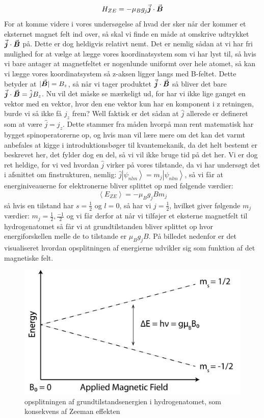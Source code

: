 \documentclass[../../Atom-ogMolekylefysik.tex]{subfiles}
\begin{document}
\begin{equation}
    H_{ZE}=-\mu_Bg_j{\vec{\boldsymbol{j}}}\cdot{\vec{\boldsymbol{B}}}
\end{equation}
For at komme videre i vores undersøgelse af hvad der sker når der kommer et eksternet magnet felt ind over, så skal vi finde en måde at omskrive udtrykket ${\vec{\boldsymbol{j}}}\cdot{\vec{\boldsymbol{B}}}$ på. Dette er dog heldigvis relativt nemt. Det er nemlig sådan at vi har fri mulighed for at vælge at lægge vores koordinatsystem som vi har lyst til, så hvis vi bare antager at magnetfeltet er nogenlunde uniformt over hele atomet, så kan vi lægge vores koordinatsystem så z-aksen ligger langs med B-feltet. Dette betyder at $|{\vec{\boldsymbol{B}}}|=B_z$, så når vi tager produktet ${\vec{\boldsymbol{j}}}\cdot{\vec{\boldsymbol{B}}}$ så bliver det bare ${\vec{\boldsymbol{j}}}\cdot{\vec{\boldsymbol{B}}}=\hat{j}B_z$. Nu vil det måske se mærkeligt ud, for har vi ikke lige ganget en vektor med en vektor, hvor den ene vektor kun har en komponent i z retningen, burde vi så ikke få $j_z$ frem? Well faktisk er det sådan at $\hat{j}$ allerede er defineret som at være $\hat{j}=j_z$. Dette stammer fra måden hvorpå man rent matematisk har bygget spinoperatorerne op, og hvis man vil lære mere om det kan det varmt anbefales at kigge i introduktionsbøger til kvantemekanik, da det helt bestemt er beskrevet her, det fylder dog en del, så vi vil ikke bruge tid på det her. Vi er dog ret heldige, for vi ved hvordan $\hat{j}$ virker på vores tilstande, da vi har undersøgt det i afsnittet om finstrukturen, nemlig: $\hat{j}\left|\psi_{nlm}\right>=m_j\left|\psi_{nlm}\right>$, så vi får at energiniveauerne for elektronerne bliver splittet op med følgende værdier:
\begin{equation}
    \left<E_{ZE}\right>=-\mu_Bg_jBm_j
\end{equation}
så hvis en tilstand har $s=\frac{1}{2}$ og $l=0$, så har vi $j=\frac{1}{2}$, hvilket giver følgende $m_j$ værdier: $m_j=\frac{1}{2},\frac{-1}{2}$ og vi får derfor at når vi tilføjer et eksterne magnetfelt til hydrogenatomet så får vi at grundtilstanden bliver splittet op hvor energiforskellen melle de to tilstande er $\mu_Bg_jB$. På billedet nedenfor er det visualiseret hvordan opsplitningen af energierne udvikler sig som funktion af det magnetiske felt.
\begin{figure}[h]
    \centering
    \includegraphics[scale=1]{Atom-ogMolekylefysik/billeder/Zeeman_Effect.jpg}
    \caption{opsplitningen af grundtilstandsenergien i hydrogenatomet, som konsekvens af Zeeman effekten}
    \label{fig:amo:vektor-projektion}
\end{figure}\\
\end{document}
